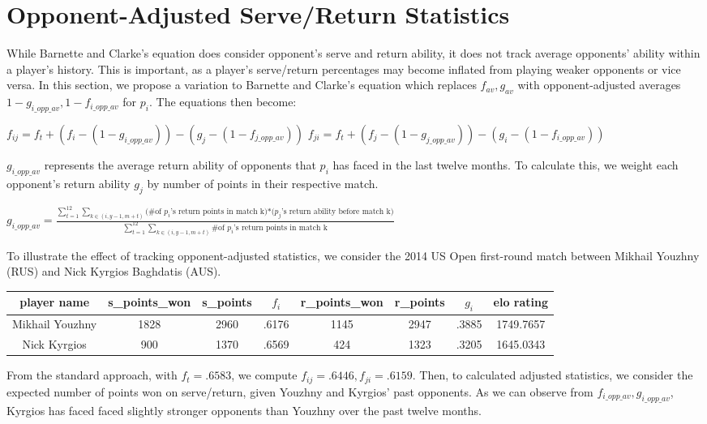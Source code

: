 \documentclass[chapterprefix=false]{report}
\begin{document}
\section{Opponent-Adjusted Serve/Return Statistics}

While Barnette and Clarke's equation does consider opponent's serve and return ability, it does not track average opponents' ability within a player's history. This is important, as a player's serve/return percentages may become inflated from playing weaker opponents or vice versa. In this section, we propose a variation to Barnette and Clarke's equation which replaces $f_{av},g_{av}$ with opponent-adjusted averages $1-g_{i\_opp\_av},1-f_{i\_opp\_av}$ for $p_i$. The equations then become:

\begin{center}
$f_{ij} = f_t + (f_i-(1-g_{i\_opp\_av}))-(g_j-(1-f_{j\_opp\_av}))$
$f_{ji} = f_t + (f_j-(1-g_{j\_opp\_av}))-(g_i-(1-f_{i\_opp\_av}))$
\end{center}

$g_{i\_opp\_av}$ represents the average return ability of opponents that $p_i$ has faced in the last twelve months. To calculate this, we weight each opponent's return ability $g_j$ by number of points in their respective match.

$g_{i\_opp\_av} = \frac{\sum_{t=1}^{12}\sum_{k \in (i,y-1,m+t)}{\text{(\# of $p_i$'s return points in match k)*($p_j$'s return ability before match k)}}}{\sum_{t=1}^{12}\sum_{k \in (i,y-1,m+t)}\text{\# of $p_i$'s return points in match k}}$

To illustrate the effect of tracking opponent-adjusted statistics, we consider the 2014 US Open first-round match between Mikhail Youzhny (RUS) and Nick Kyrgios Baghdatis (AUS).

\begin{center}
\begin{tabular}{ |c|c|c|c|c|c|c|c| } 
 \hline
 player name & s\_points\_won & s\_points
 & $f_i$ & r\_points\_won & r\_points & $g_i$ & elo rating \\ 
 \hline
 Mikhail Youzhny & 1828 & 2960 & .6176 & 1145 & 2947 & .3885 & 1749.7657
 \\
 \hline
 Nick Kyrgios & 900 & 1370 & .6569 & 424 & 1323 & .3205 & 1645.0343 \\ 
 \hline
\end{tabular}
\end{center}

From the standard approach, with $f_t =.6583$, we compute $f_{ij} = .6446, f_{ji} = .6159$. Then, to calculated adjusted statistics, we consider the expected number of points won on serve/return, given Youzhny and Kyrgios' past opponents. As we can observe from $f_{i\_opp\_av},g_{i\_opp\_av}$, Kyrgios has faced faced slightly stronger opponents than Youzhny over the past twelve months.
\end{document}
